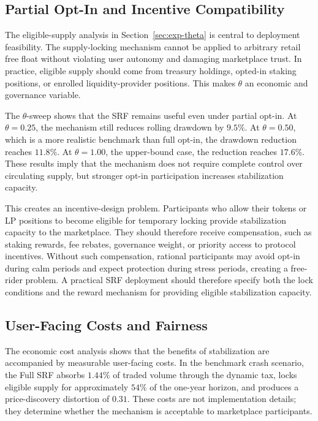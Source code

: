 \documentclass[a4paper,fleqn]{cas-dc}
\begin{document}
\subsection{Partial Opt-In and Incentive Compatibility}
\label{subsec:discussion_opt_in}

The eligible-supply analysis in Section~\ref{sec:exp-theta} is central to deployment feasibility. The supply-locking mechanism cannot be applied to arbitrary retail free float without violating user autonomy and damaging marketplace trust. In practice, eligible supply should come from treasury holdings, opted-in staking positions, or enrolled liquidity-provider positions. This makes \(\theta\) an economic and governance variable.

The \(\theta\)-sweep shows that the SRF remains useful even under partial opt-in. At \(\theta=0.25\), the mechanism still reduces rolling drawdown by \(9.5\%\). At \(\theta=0.50\), which is a more realistic benchmark than full opt-in, the drawdown reduction reaches \(11.8\%\). At \(\theta=1.00\), the upper-bound case, the reduction reaches \(17.6\%\). These results imply that the mechanism does not require complete control over circulating supply, but stronger opt-in participation increases stabilization capacity.

This creates an incentive-design problem. Participants who allow their tokens or LP positions to become eligible for temporary locking provide stabilization capacity to the marketplace. They should therefore receive compensation, such as staking rewards, fee rebates, governance weight, or priority access to protocol incentives. Without such compensation, rational participants may avoid opt-in during calm periods and expect protection during stress periods, creating a free-rider problem. A practical SRF deployment should therefore specify both the lock conditions and the reward mechanism for providing eligible stabilization capacity.

\subsection{User-Facing Costs and Fairness}
\label{subsec:discussion_fairness}

The economic cost analysis shows that the benefits of stabilization are accompanied by measurable user-facing costs. In the benchmark crash scenario, the Full SRF absorbs \(1.44\%\) of traded volume through the dynamic tax, locks eligible supply for approximately \(54\%\) of the one-year horizon, and produces a price-discovery distortion of \(0.31\). These costs are not implementation details; they determine whether the mechanism is acceptable to marketplace participants.
\end{document}
